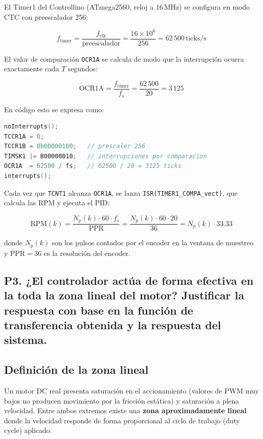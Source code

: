 \documentclass[journal, onecolumn]{IEEEtran}
\begin{document}
El Timer1 del Controllino (ATmega2560, reloj a $16\,\text{MHz}$) se configura
en modo CTC con preescalador 256:

\[
  f_{\text{timer}} = \frac{f_{\text{clk}}}{\text{preescalador}}
  = \frac{16 \times 10^6}{256} = 62\,500\,\text{ticks/s}
\]

El valor de comparación \texttt{OCR1A} se calcula de modo que la interrupción
ocurra exactamente cada $T$ segundos:

\[
  \text{OCR1A} = \frac{f_{\text{timer}}}{f_s} = \frac{62\,500}{20} = 3\,125
\]

En código esto se expresa como:
\begin{lstlisting}[language=C++, caption={Configuración del Timer1 a 20\,Hz (Stone PID)}]
noInterrupts();
TCCR1A = 0;
TCCR1B = 0b00000100;   // prescaler 256
TIMSK1 |= B00000010;   // interrupciones por comparacion
OCR1A  = 62500 / fs;   // 62500 / 20 = 3125 ticks
interrupts();
\end{lstlisting}

Cada vez que \texttt{TCNT1} alcanza \texttt{OCR1A}, se lanza
\texttt{ISR(TIMER1\_COMPA\_vect)}, que calcula las RPM y ejecuta el PID:

\[
  \text{RPM}(k) = \frac{N_p(k)\cdot 60 \cdot f_s}{\text{PPR}}
  = \frac{N_p(k)\cdot 60 \cdot 20}{36} = N_p(k)\cdot 33.33
\]

donde $N_p(k)$ son los pulsos contados por el encoder en la ventana de
muestreo y $\text{PPR} = 36$ es la resolución del encoder.



\subsection*{P3. ¿El controlador actúa de forma efectiva en la toda la zona lineal del motor? Justificar la respuesta con base en la función de transferencia obtenida y la respuesta del sistema.}


\subsection{Definición de la zona lineal}

Un motor DC real presenta saturación en el accionamiento (valores de PWM muy
bajos no producen movimiento por la fricción estática) y saturación a plena
velocidad. Entre ambos extremos existe una \textbf{zona aproximadamente lineal}
donde la velocidad responde de forma proporcional al ciclo de trabajo (duty
cycle) aplicado.
\end{document}
